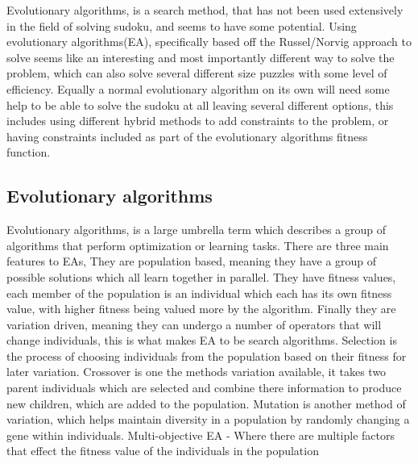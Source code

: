 \documentclass[a4paper,11pt]{article}
\begin{document}
Evolutionary algorithms, is a search method, that has not been used extensively in the field of solving sudoku, and seems to have some potential. Using evolutionary algorithms(EA), specifically based off the Russel/Norvig approach \cite{modernAI} to solve seems like an interesting and most importantly different way to solve the problem, which can also solve several different size puzzles with some level of efficiency. Equally a normal evolutionary algorithm on its own will need some help to be able to solve the sudoku at all leaving several different options, this includes using different hybrid methods to add constraints to the problem, or having constraints included as part of the evolutionary algorithms fitness function.\newline\newline

\subsection{Evolutionary algorithms}

Evolutionary algorithms, is a large umbrella term which describes a group of algorithms that perform optimization or learning tasks. There are three main features to EAs, They are population based, meaning they have a group of possible solutions which all learn together in parallel. They have fitness values, each member of the population is an individual which each has its own fitness value, with higher fitness being valued more by the algorithm. Finally they are variation driven, meaning they can undergo a number of operators that will change individuals, this is what makes EA to be search algorithms.\cite{introToEA}
Selection is the process of choosing individuals from the population based on their fitness for later variation. Crossover is one the methods variation available, it takes two parent individuals which are selected and combine there information to produce new  children, which are added to the population. 
Mutation is another method of variation, which helps maintain diversity in a population by randomly changing a gene within individuals.
Multi-objective EA - Where there are multiple factors that effect the fitness value of the individuals in the population
\end{document}
